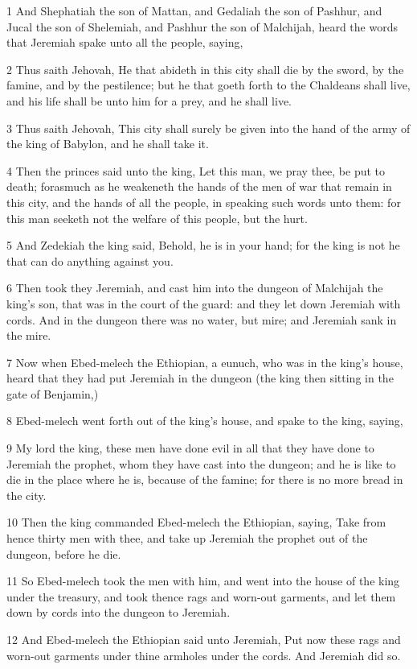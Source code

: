 \par 1 And Shephatiah the son of Mattan, and Gedaliah the son of Pashhur, and Jucal the son of Shelemiah, and Pashhur the son of Malchijah, heard the words that Jeremiah spake unto all the people, saying,
\par 2 Thus saith Jehovah, He that abideth in this city shall die by the sword, by the famine, and by the pestilence; but he that goeth forth to the Chaldeans shall live, and his life shall be unto him for a prey, and he shall live.
\par 3 Thus saith Jehovah, This city shall surely be given into the hand of the army of the king of Babylon, and he shall take it.
\par 4 Then the princes said unto the king, Let this man, we pray thee, be put to death; forasmuch as he weakeneth the hands of the men of war that remain in this city, and the hands of all the people, in speaking such words unto them: for this man seeketh not the welfare of this people, but the hurt.
\par 5 And Zedekiah the king said, Behold, he is in your hand; for the king is not he that can do anything against you.
\par 6 Then took they Jeremiah, and cast him into the dungeon of Malchijah the king's son, that was in the court of the guard: and they let down Jeremiah with cords. And in the dungeon there was no water, but mire; and Jeremiah sank in the mire.
\par 7 Now when Ebed-melech the Ethiopian, a eunuch, who was in the king's house, heard that they had put Jeremiah in the dungeon (the king then sitting in the gate of Benjamin,)
\par 8 Ebed-melech went forth out of the king's house, and spake to the king, saying,
\par 9 My lord the king, these men have done evil in all that they have done to Jeremiah the prophet, whom they have cast into the dungeon; and he is like to die in the place where he is, because of the famine; for there is no more bread in the city.
\par 10 Then the king commanded Ebed-melech the Ethiopian, saying, Take from hence thirty men with thee, and take up Jeremiah the prophet out of the dungeon, before he die.
\par 11 So Ebed-melech took the men with him, and went into the house of the king under the treasury, and took thence rags and worn-out garments, and let them down by cords into the dungeon to Jeremiah.
\par 12 And Ebed-melech the Ethiopian said unto Jeremiah, Put now these rags and worn-out garments under thine armholes under the cords. And Jeremiah did so.
